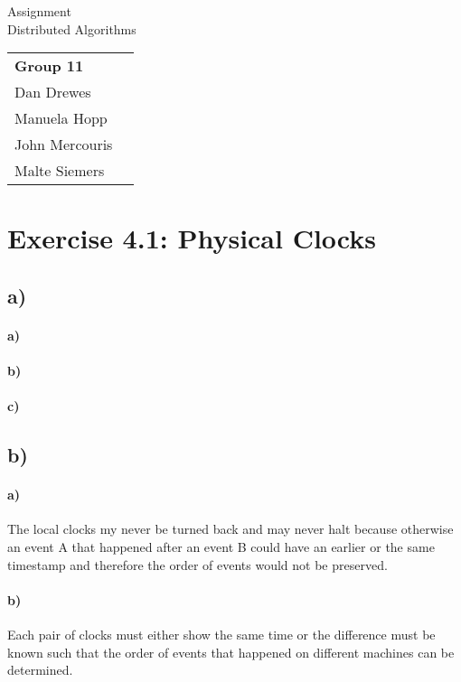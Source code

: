 \documentclass[12pt,a4paper]{article}
\begin{document}
\begin{center}
  \Large Assignment  \\
  \large Distributed Algorithms
\end{center}
\begin{flushright}
  \begin{tabular}{ll}
    \textbf{Group 11} \\
    Dan Drewes        \\ 
    Manuela Hopp      \\ 
    John Mercouris    \\
    Malte Siemers     \\
  \end{tabular} 
\end{flushright}


\section*{Exercise 4.1: Physical Clocks}
  \subsection*{a)} %
  	\paragraph{a)}
  	\paragraph{b)}
  	\paragraph{c)}
  \subsection*{b)} %
    \paragraph{a)} The local clocks my never be turned back and may never halt because otherwise an event A that happened after an event B could have an earlier or the same timestamp and therefore the order of events would not be preserved.
  	\paragraph{b)} Each pair of clocks must either show the same time or the difference must be known such that the order of events that happened on different machines can be determined.
\end{document}

